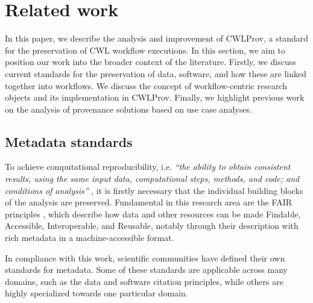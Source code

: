 \section{Related work}
\label{sec:background}

In this paper, we describe the analysis and improvement of CWLProv, a standard for the preservation of CWL workflow executions. In this section, we aim to position our work into the broader context of the literature. Firstly, we discuss current standards for the preservation of data, software, and how these are linked together into workflows. We discuss the concept of workflow-centric research objects and its implementation in CWLProv. Finally, we highlight previous work on the analysis of provenance solutions based on use case analyses. 

\subsection{Metadata standards}
To achieve computational reproducibility, i.e. \emph{``the ability to obtain consistent results, using the same input data, computational steps, methods, and code; and conditions of analysis''} \cite{committeeonreproducibilityandreplicabilityinscienceReproducibilityReplicabilityScience2019}, it is firstly necessary that the individual building blocks of the analysis are preserved. Fundamental in this research area are the FAIR principles \cite{wilkinsonFAIRGuidingPrinciples2016}, which describe how data and other resources can be made Findable, Accessible, Interoperable, and Reusable, notably through their description with rich metadata in a machine-accessible format. 

In compliance with this work, scientific communities have defined their own standards for metadata. Some of these standards are applicable across many domains, such as the data \cite{datacitationsynthesisgroupJointDeclarationData2014} and software \cite{smithSoftwareCitationPrinciples2016} citation principles, while others are highly specialized towards one particular domain. 

